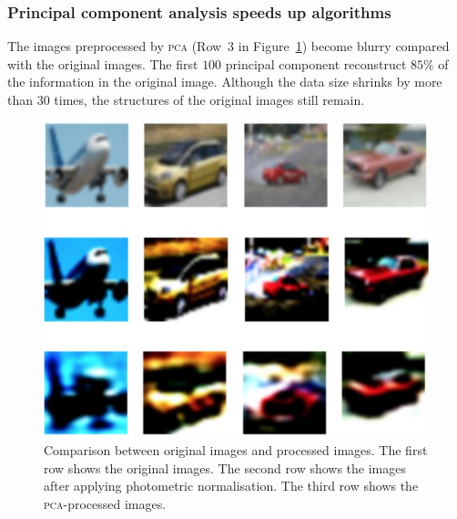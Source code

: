 \documentclass[12pt]{article} %
\begin{document}
\subsubsection{Principal component analysis  speeds up algorithms}

The images preprocessed by \textsc{pca}  (Row~3 in Figure~\ref{fig:Compare_Image}) become blurry compared with the original images. The first $100$ principal component reconstruct $85\%$ of the information in the original image. Although the data size shrinks by more than $30$ times, the structures of the original images still remain.
\begin{figure} 
    \centering
	\includegraphics[scale=0.6]{img}
	\caption{Comparison between original images and processed images. The first row shows the original images. The second row shows the images after applying photometric normalisation. The third row shows the \textsc{pca}-processed images.}
	\label{fig:Compare_Image}
\end{figure}
\end{document}
